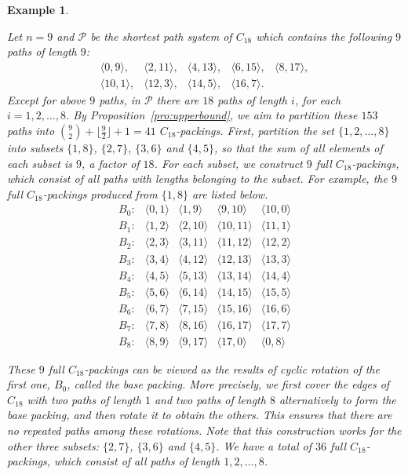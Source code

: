 \documentclass[journal,draftcls,onecolumn,12pt,twoside]{IEEEtran}
\newtheorem{example}{Example}
\begin{document}
\begin{example}\label{exa:20}
{\rm
Let $n=9$ and $\mathcal{P}$ be the shortest path system of $C_{18}$ which contains the following $9$ paths of length $9$:
$$
\begin{array}{lllll}
\langle 0,9\rangle, & \langle 2,11\rangle, & \langle 4,13\rangle, & \langle 6,15\rangle, & \langle 8,17\rangle, \\
\langle 10,1\rangle, & \langle 12,3\rangle, & \langle 14,5\rangle, & \langle 16,7\rangle. & 
\end{array}
$$
Except for above $9$ paths, in $\mathcal{P}$ there are $18$ paths of length $i$, for each $i=1,2,\ldots,8$.
By Proposition~\ref{pro:upperbound}, we aim to partition these $153$ paths into ${9\choose 2}+\lfloor\frac{9}{2}\rfloor+1=41$ $C_{18}$-packings.
First, partition the set $\{1,2,\ldots,8\}$ into subsets $\{1,8\}$, $\{2,7\}$, $\{3,6\}$ and $\{4,5\}$, so that the sum of all elements of each subset is $9$, a factor of $18$.
For each subset, we construct $9$ full $C_{18}$-packings, which consist of all paths with lengths belonging to the subset.
For example, the $9$ full $C_{18}$-packings produced from $\{1,8\}$ are listed below.
$$
\begin{array}{rcccc}
B_0: & \langle 0,1\rangle & \langle 1,9\rangle & \langle 9,10\rangle & \langle 10,0\rangle \\
B_1: & \langle 1,2\rangle & \langle 2,10\rangle & \langle 10,11\rangle & \langle 11,1\rangle \\
B_2: & \langle 2,3\rangle & \langle 3,11\rangle & \langle 11,12\rangle & \langle 12,2\rangle \\
B_3: & \langle 3,4\rangle & \langle 4,12\rangle & \langle 12,13\rangle & \langle 13,3\rangle \\
B_4: & \langle 4,5\rangle & \langle 5,13\rangle & \langle 13,14\rangle & \langle 14,4\rangle \\
B_5: & \langle 5,6\rangle & \langle 6,14\rangle & \langle 14,15\rangle & \langle 15,5\rangle \\
B_6: & \langle 6,7\rangle & \langle 7,15\rangle & \langle 15,16\rangle & \langle 16,6\rangle \\
B_7: & \langle 7,8\rangle & \langle 8,16\rangle & \langle 16,17\rangle & \langle 17,7\rangle \\
B_8: & \langle 8,9\rangle & \langle 9,17\rangle & \langle 17,0\rangle & \langle 0,8\rangle
\end{array}
$$

\noindent
These $9$ full $C_{18}$-packings can be viewed as the results of cyclic rotation of the first one, $B_0$, called the \emph{base packing}.
More precisely, we first cover the edges of $C_{18}$ with two paths of length $1$ and two paths of length $8$ alternatively to form the base packing, and then rotate it to obtain the others.
This ensures that there are no repeated paths among these rotations.
Note that this construction works for the other three subsets: $\{2,7\}$, $\{3,6\}$ and $\{4,5\}$.
We have a total of $36$ full $C_{18}$-packings, which consist of all paths of length $1,2,\ldots,8$.

}
\end{example}
\end{document}
